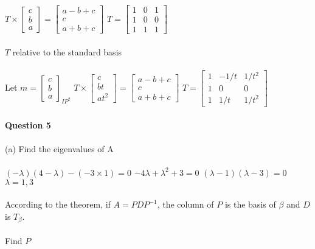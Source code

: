 \documentclass{article}
\begin{document}
$
T\times\begin{bmatrix}c\\b\\a\end{bmatrix} = \begin{bmatrix}a - b + c\\c\\a + b + c\end{bmatrix}
$
\indent\indent
$
T = \begin{bmatrix}1&0&1\\1&0&0\\1&1&1\end{bmatrix}
$
\\\\
\indent\indent
$T$ relative to the standard basis
\\\\
\indent\indent
Let $m = \begin{bmatrix}c\\b\\a\end{bmatrix}_{IP^2}$
\indent\indent
$
T \times \begin{bmatrix}c\\bt\\at^2\end{bmatrix} = \begin{bmatrix}a - b + c\\c\\a + b + c\end{bmatrix}
$
\indent\indent
$
T = \begin{bmatrix}1&-1/t&1/t^2\\1&0&0\\1&1/t&1/t^2\end{bmatrix}
$
\\\\
\noindent\textbf{Question 5}
\\\\
\indent(a) Find the eigenvalues of A
\\\\
\indent\indent
$
(-\lambda)(4-\lambda) - (-3 \times 1) = 0
$
\indent
$
-4\lambda+\lambda^2 + 3 = 0
$
\indent
$
(\lambda-1)(\lambda-3) = 0
$
\indent
$
\lambda = 1, 3
$
\\\\
\indent\indent
According to the theorem, if $A = PDP^{-1}$, the column of $P$ is the basis of $\beta$ and $D$ is $T_\beta$.
\\\\
\indent\indent
Find $P$
\\\\
\end{document}
